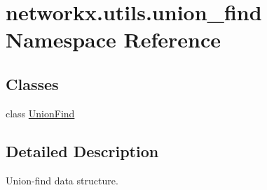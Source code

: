\hypertarget{namespacenetworkx_1_1utils_1_1union__find}{}\section{networkx.\+utils.\+union\+\_\+find Namespace Reference}
\label{namespacenetworkx_1_1utils_1_1union__find}
\subsection*{Classes}
\begin{DoxyCompactItemize}
\item 
class \hyperlink{classnetworkx_1_1utils_1_1union__find_1_1UnionFind}{Union\+Find}
\end{DoxyCompactItemize}


\subsection{Detailed Description}
\begin{DoxyVerb}Union-find data structure.
\end{DoxyVerb}
 